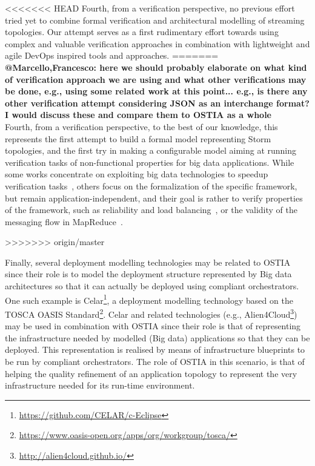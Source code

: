 <<<<<<< HEAD
Fourth, from a verification perspective, no previous effort tried yet to combine formal verification and architectural modelling of streaming topologies. Our attempt serves as a first rudimentary effort towards using complex and valuable verification approaches in combination with lightweight and agile DevOps inspired tools and approaches.
=======
\textbf{@Marcello,Francesco: here we should probably elaborate on what kind of verification approach we are using and what other verifications may be done, e.g., using some related work at this point... e.g., is there any other verification attempt considering JSON as an interchange format? I would discuss these and compare them to OSTIA as a whole}\\
Fourth, from a verification perspective, to the best of our knowledge, this represents the first attempt to build a formal model representing Storm topologies, and the first try in making a configurable model aiming at running verification tasks of non-functional properties for big data applications. While some works concentrate on exploiting big data technologies to speedup verification tasks~\cite{camilli2014}, others focus on the formalization of the specific framework, but remain application-independent, and their goal is rather to verify properties of the framework, such as reliability and load balancing~\cite{dicomputational}, or the validity of the messaging flow in MapReduce~\cite{yang2010formalizing}.

>>>>>>> origin/master

Finally, several deployment modelling technologies may be related to OSTIA since their role is to model the deployment structure represented by Big data architectures so that it can actually be deployed using compliant orchestrators. One such example is Celar\footnote{\url{https://github.com/CELAR/c-Eclipse}}, a deployment modelling technology based on the TOSCA OASIS Standard\footnote{\url{https://www.oasis-open.org/apps/org/workgroup/tosca/}}. Celar and related technologies (e.g., Alien4Cloud\footnote{\url{http://alien4cloud.github.io/}}) may be used in combination with OSTIA since their role is that of representing the infrastructure needed by modelled (Big data) applications so that they can be deployed. This representation is realised by means of infrastructure blueprints to be run by compliant orchestrators. The role of OSTIA in this scenario, is that of helping the quality refinement of an application topology to represent the very infrastructure needed for its run-time environment.

